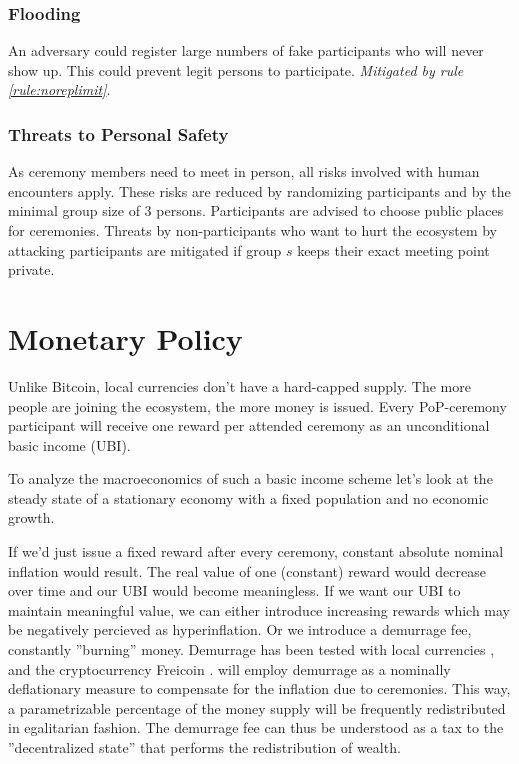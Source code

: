 \documentclass[conference]{IEEEtran}
\begin{document}
\subsubsection{Flooding}
An adversary could register large numbers of fake participants who will never show up. This could prevent legit persons to participate.
 \textit{Mitigated by rule \ref{rule:noreplimit}}.
\subsubsection{Threats to Personal Safety}\label{safetythreat}
As ceremony members need to meet in person, all risks involved with human encounters apply. These risks are reduced by randomizing participants and by the minimal group size of 3 persons. Participants are advised to choose public places for ceremonies.
Threats by non-participants who want to hurt the \encointer ecosystem by attacking participants are mitigated if group $s$ keeps their exact meeting point private. 

\section{Monetary Policy}
Unlike Bitcoin, \encointer local currencies don't have a hard-capped supply. The more people are joining the ecosystem, the more money is issued. Every PoP-ceremony participant will receive one reward per attended ceremony as an unconditional basic income (UBI). 

To analyze the macroeconomics of such a basic income scheme let's look at the steady state of a stationary economy with a fixed population and no economic growth. 

If we'd just issue a fixed reward after every ceremony, constant absolute nominal inflation would result. The real value of one (constant) reward would decrease over time and our UBI would become meaningless. If we want our UBI to maintain meaningful value, we can either introduce increasing rewards which may be negatively percieved as hyperinflation. Or we introduce a demurrage fee, constantly ''burning'' money. Demurrage has been tested with local currencies \cite{WIR}, \cite{Chiemgauer} and the cryptocurrency Freicoin \cite{freicoin}. \encointer will employ demurrage as a nominally deflationary measure to compensate for the inflation due to ceremonies. This way, a parametrizable percentage of the money supply will be frequently redistributed in egalitarian fashion. The demurrage fee can thus be understood as a tax to the ''decentralized state'' that performs the redistribution of wealth.
\end{document}
